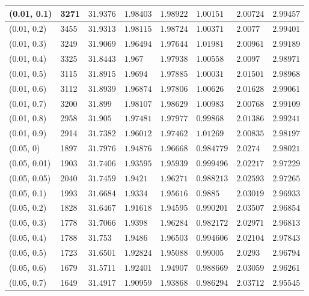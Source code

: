 \begin{center}
{\begin{longtable}{| l | p{} |  p{} | p{} | p{} | p{} | p{} | p{} |}
 (0.01, 0.1) & 3271  & $31.9376$ & $1.98403$ & $1.98922$ & $1.00151$ & $2.00724$ & $2.99457$ \\ \hline
 (0.01, 0.2) & 3455  & $31.9313$ & $1.98115$ & $1.98724$ & $1.00371$ & $2.0077$ & $2.99401$ \\ \hline
 (0.01, 0.3) & 3249  & $31.9069$ & $1.96494$ & $1.97644$ & $1.01981$ & $2.00961$ & $2.99189$ \\ \hline
 (0.01, 0.4) & 3325  & $31.8443$ & $1.967$ & $1.97938$ & $1.00558$ & $2.0097$ & $2.98971$ \\ \hline
 (0.01, 0.5) & 3115  & $31.8915$ & $1.9694$ & $1.97885$ & $1.00031$ & $2.01501$ & $2.98968$ \\ \hline
 (0.01, 0.6) & 3112  & $31.8939$ & $1.96874$ & $1.97806$ & $1.00626$ & $2.01628$ & $2.99061$ \\ \hline
 (0.01, 0.7) & 3200  & $31.899$ & $1.98107$ & $1.98629$ & $1.00983$ & $2.00768$ & $2.99109$ \\ \hline
 (0.01, 0.8) & 2958  & $31.905$ & $1.97481$ & $1.97977$ & $0.99868$ & $2.01386$ & $2.99241$ \\ \hline
 (0.01, 0.9) & 2914  & $31.7382$ & $1.96012$ & $1.97462$ & $1.01269$ & $2.00835$ & $2.98197$ \\ \hline
 (0.05, 0) & 1897  & $31.7976$ & $1.94876$ & $1.96668$ & $0.984779$ & $2.0274$ & $2.98021$ \\ \hline
 (0.05, 0.01) & 1903  & $31.7406$ & $1.93595$ & $1.95939$ & $0.999496$ & $2.02217$ & $2.97229$ \\ \hline
 (0.05, 0.05) & 2040  & $31.7459$ & $1.9421$ & $1.96271$ & $0.988213$ & $2.02593$ & $2.97265$ \\ \hline
 (0.05, 0.1) & 1993  & $31.6684$ & $1.9334$ & $1.95616$ & $0.9885$ & $2.03019$ & $2.96933$ \\ \hline
 (0.05, 0.2) & 1828  & $31.6467$ & $1.91618$ & $1.94595$ & $0.990201$ & $2.03507$ & $2.96854$ \\ \hline
 (0.05, 0.3) & 1778  & $31.7066$ & $1.9398$ & $1.96284$ & $0.982172$ & $2.02971$ & $2.96813$ \\ \hline
 (0.05, 0.4) & 1788  & $31.753$ & $1.9486$ & $1.96503$ & $0.994606$ & $2.02104$ & $2.97843$ \\ \hline
 (0.05, 0.5) & 1723  & $31.6501$ & $1.92824$ & $1.95088$ & $0.99005$ & $2.0293$ & $2.96794$ \\ \hline
 (0.05, 0.6) & 1679  & $31.5711$ & $1.92401$ & $1.94907$ & $0.988669$ & $2.03059$ & $2.96261$ \\ \hline
 (0.05, 0.7) & 1649  & $31.4917$ & $1.90959$ & $1.93868$ & $0.986294$ & $2.03712$ & $2.95545$ \\ \hline

\end{longtable}}
\end{center}
